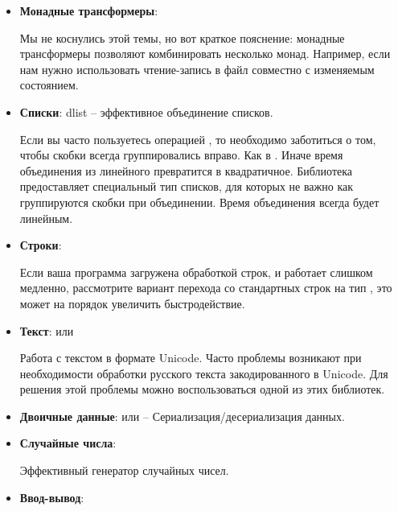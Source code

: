 \begin{itemize}
\item \textbf{Монадные трансформеры}: 

    Мы не коснулись этой темы, но вот краткое пояснение:
    монадные трансформеры позволяют комбинировать несколько
    монад. Например, если нам нужно использовать чтение-запись 
    в файл совместно с изменяемым состоянием.

\end{itemize}


\begin{itemize}
\item \textbf{Списки}: {dlist} -- эффективное объединение списков.

            Если вы часто пользуетесь операцией \In{++},
            то необходимо заботиться о том, чтобы скобки
            всегда группировались вправо. Как в .
            Иначе время объединения из линейного превратится
            в квадратичное. Библиотека  предоставляет
            специальный тип списков, для которых не важно как 
            группируются скобки при объединении. Время 
            объединения всегда будет линейным. 

\item \textbf{Строки}: 
    
    Если ваша программа загружена обработкой строк,
    и работает слишком медленно, рассмотрите вариант
    перехода со стандартных строк на тип ,
    это может на порядок увеличить быстродействие.

\item \textbf{Текст}:  или  

    Работа с текстом в формате Unicode. Часто проблемы 
    возникают при необходимости обработки русского текста
    закодированного в Unicode. Для решения этой проблемы 
    можно воспользоваться одной из этих библиотек.

\item \textbf{Двоичные данные}:  
        или  -- Сериализация/десериализация данных.

\item \textbf{Случайные числа}: 

    Эффективный генератор случайных чисел.

\item \textbf{Ввод-вывод}: 


\end{itemize}
